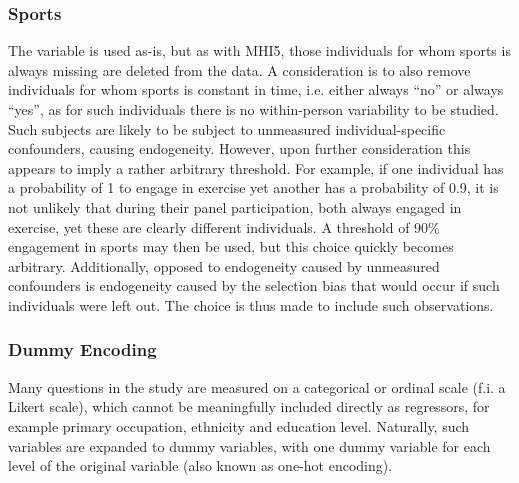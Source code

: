 \subsubsection{Sports}
The variable is used as-is, but as with MHI5, those individuals for whom sports is always missing are deleted from the data.
A consideration is to also remove individuals for whom sports is constant in time, i.e. either always ``no'' or always ``yes'',
as for such individuals there is no within-person variability to be studied. Such subjects are likely to be subject
to unmeasured individual-specific confounders, causing endogeneity.
However, upon further consideration this appears to imply a rather arbitrary threshold. For example, if one individual has a
probability of 1 to engage in exercise yet another has a probability of 0.9, it is not unlikely that during their
panel participation, both always engaged in exercise, yet these are clearly different individuals.
A threshold of 90\% engagement in sports may then be used, but this choice quickly becomes arbitrary.
Additionally, opposed to endogeneity caused by unmeasured confounders is endogeneity caused by the selection bias
that would occur if such individuals were left out.
The choice is thus made to include such observations.

\subsubsection{Dummy Encoding}
Many questions in the study are measured on a categorical or ordinal scale (f.i. a Likert scale), which cannot be
meaningfully included directly as regressors, for example primary occupation, ethnicity and education level.
Naturally, such variables are expanded to dummy variables, with one dummy variable for each level of the original variable
(also known as one-hot encoding).

